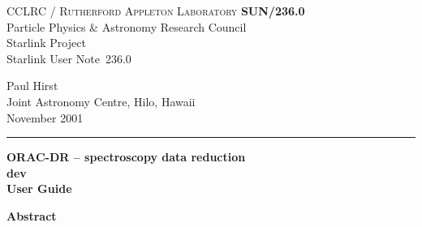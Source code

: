 \documentclass[twoside,11pt]{article}
\newcommand{\stardoccategory}  {Starlink User Note}
\newcommand{\stardocinitials}  {SUN}
\newcommand{\stardocnumber}    {236.0}
\newcommand{\stardocauthors}   {Paul Hirst \\
                                Joint Astronomy Centre, Hilo, Hawaii}
\newcommand{\stardocdate}      {November 2001}
\newcommand{\stardoctitle}     {ORAC-DR -- spectroscopy data reduction}
\newcommand{\stardocversion}   {dev}
\newcommand{\stardocmanual}    {User Guide}
\newcommand{\stardocname}{\stardocinitials /\stardocnumber}
\newenvironment{latexonly}{}{}
\renewcommand{\_}{\texttt{\symbol{95}}}
\begin{document}
\setcounter{secnumdepth}{5}
\thispagestyle{empty}

\begin{latexonly}
   CCLRC / \textsc{Rutherford Appleton Laboratory} \hfill \textbf{\stardocname}\\
   {\large Particle Physics \& Astronomy Research Council}\\
   {\large Starlink Project\\}
   {\large \stardoccategory\ \stardocnumber}
   \begin{flushright}
   \stardocauthors\\
   \stardocdate
   \end{flushright}
   \vspace{-4mm}
   \rule{\textwidth}{0.5mm}
   \vspace{5mm}
   \begin{center}
   {\Huge\textbf{\stardoctitle \\ [2.5ex]}}
   {\LARGE\textbf{\stardocversion \\ [4ex]}}
   {\Huge\textbf{\stardocmanual}}
   \end{center}
   \vspace{5mm}


   \vspace{10mm}
   \begin{center}
      {\Large\textbf{Abstract}}
   \end{center}
\end{latexonly}
\end{document}

